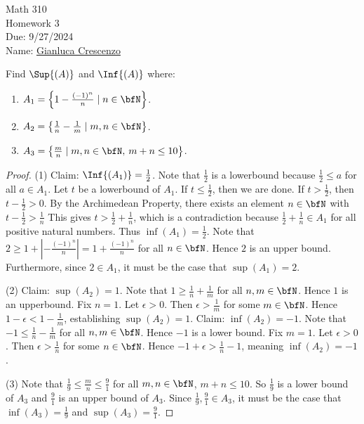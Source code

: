 \documentclass[10pt,twoside,openany]{memoir}
\begin{document}
\begin{center}
    { \Large Math 310 \\[0.1in]Homework 3 \\[0.1in]
    Due: 9/27/2024}\\[.25in]
    { Name:} {\underline{Gianluca Crescenzo\hspace*{2in}}}\\[0.15in]
    \end{center}
    \vspace{4pt}
    \begin{exercise}
        Find $\Sup{(A)}$ and $\Inf{(A)}$ where:
            \begin{enumerate}[label = (\arabic*)]
                \item $A_1 = \left\{1 - \frac{(-1)^n}{n} \mid n \in \bfN\right\}$.
                \item $A_2 = \left\{\frac{1}{n} - \frac{1}{m} \mid m,n \in \bfN\right\}$.
                \item $A_3 = \left\{ \frac{m}{n} \mid m,n \in \bfN,\hspace{2pt} m+n \leq 10\right\}$.
            \end{enumerate} 
    \end{exercise}
        \begin{proof}
            (1) Claim: $\Inf{(A_1)} = \frac{1}{2}$. Note that $\frac{1}{2}$ is a lowerbound because $\frac{1}{2} \leq a$ for all $a \in A_1$. Let $t$ be a lowerbound of $A_1$. If $t \leq \frac{1}{2}$, then we are done. If $t>\frac{1}{2}$, then $t - \frac{1}{2} > 0$. By the Archimedean Property, there exists an element $n \in \bfN$ with $t - \frac{1}{2} > \frac{1}{n}$ This gives $t > \frac{1}{2} + \frac{1}{n}$, which is a contradiction because $\frac{1}{2}+\frac{1}{n} \in A_1$ for all positive natural numbers. Thus $\inf{(A_1)} = \frac{1}{2}$. Note that $2 \geq 1  + \left|  - \frac{(-1)^n}{n}\right| = 1 + \frac{(-1)^n}{n}$ for all $n \in \bfN$. Hence $2$ is an upper bound. Furthermore, since $2 \in A_1$, it must be the case that $\sup(A_1) = 2$.

            (2) Claim: $\sup(A_2) = 1$. Note that $1 \geq \frac{1}{n} + \frac{1}{m}$ for all $n,m \in \bfN$. Hence $1$ is an upperbound. Fix $n = 1$. Let $\epsilon > 0$. Then $\epsilon > \frac{1}{m}$ for some $m \in \bfN$. Hence $1 - \epsilon < 1 - \frac{1}{m}$, establishing $\sup(A_2) =1 $. Claim: $\inf(A_2) = -1$. Note that $-1 \leq \frac{1}{n} - \frac{1}{m}$ for all $n,m \in \bfN$. Hence $-1$ is a lower bound. Fix $m=1$. Let $\epsilon > 0$. Then $\epsilon > \frac{1}{n}$ for some $n \in \bfN$. Hence $-1 + \epsilon > \frac{1}{n} - 1$, meaning $\inf(A_2) = -1$. 

            (3) Note that $\frac{1}{9} \leq \frac{m}{n} \leq \frac{9}{1}$ for all $m,n \in \bfN$, $m+n \leq 10$. So $\frac{1}{9}$ is a lower bound of $A_3$ and $\frac{9}{1}$ is an upper bound of $A_3$. Since $\frac{1}{9}, \frac{9}{1} \in A_3$, it must be the case that $\inf(A_3) = \frac{1}{9}$ and $\sup{(A_3)} = \frac{9}{1}$.
        \end{proof}
\end{document}
